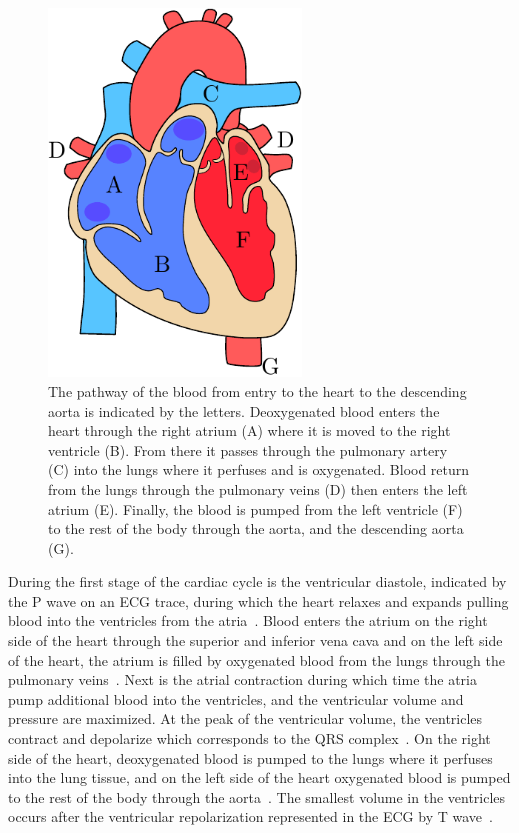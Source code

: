 \begin{figure}
    \centering
    \includegraphics[width=0.6\textwidth]{chapter2-background/imgs/heart_drawing.pdf}
    \caption[Sketch of the anatomical heart]{ The pathway of the blood
    from entry to the heart to the descending aorta is indicated by the
    letters. Deoxygenated blood enters the heart through the right atrium
    (A) where it is moved to the right ventricle (B). From there it passes through 
    the pulmonary artery (C) into the lungs where it perfuses and is oxygenated. 
    Blood return from the lungs through the pulmonary veins (D) then enters 
    the left atrium (E). Finally, the blood is pumped from the left
    ventricle (F) to the rest of the body through the aorta, and the
    descending aorta (G).}
    \label{fig:anatomical_heart}
\end{figure}

During the first stage of the cardiac cycle is the ventricular
diastole, indicated by the P wave on an ECG trace, during 
which the heart relaxes and expands
pulling blood into the ventricles from the 
atria~\parencite{pappano_cardiovascular_2019}. Blood enters the atrium 
on the right side of the heart through the
superior and inferior vena cava and on the left side of the heart, the atrium is 
filled by oxygenated blood from the lungs through the pulmonary 
veins~\parencite{pappano_cardiovascular_2019}.
Next is the atrial contraction during which time the atria pump additional
blood into the ventricles, and the ventricular volume and pressure 
are maximized. At the peak of the ventricular volume, the ventricles contract 
and depolarize which corresponds to the QRS complex~\parencite{pollock_physiology_2021}. 
On the right side of the heart, deoxygenated blood is pumped 
to the lungs where it perfuses into the lung tissue, and on the left side of 
the heart oxygenated blood is pumped to the rest of the body through the 
aorta~\parencite{pappano_cardiovascular_2019}. The smallest volume in the ventricles occurs after 
the ventricular repolarization represented in the ECG by
T wave~\parencite{pollock_physiology_2021}.

